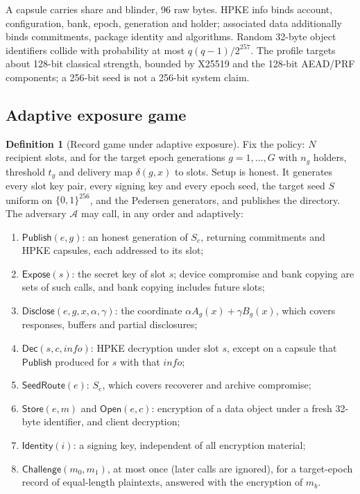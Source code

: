 \documentclass[pdflatex,sn-mathphys-num]{sn-jnl}
\theoremstyle{plain}
\theoremstyle{definition}
\newtheorem{definition}[theorem]{Definition}
\begin{document}
A capsule carries share and blinder, 96 raw bytes. HPKE info binds account, configuration, bank, epoch, generation and holder; associated data additionally binds commitments, package identity and algorithms. Random 32-byte object identifiers collide with probability at most $q(q-1)/2^{257}$. The profile targets about 128-bit classical strength, bounded by X25519 and the 128-bit AEAD/PRF components; a 256-bit seed is not a 256-bit system claim.

\subsection{Adaptive exposure game}\label{sec:adaptive}
\begin{definition}[Record game under adaptive exposure]\label{def:adaptivegame}
Fix the policy: $N$ recipient slots, and for the target epoch generations $g=1,\dots,G$ with $n_g$ holders, threshold $t_g$ and delivery map $\delta(g,x)$ to slots. Setup is honest. It generates every slot key pair, every signing key and every epoch seed, the target seed $S$ uniform on $\{0,1\}^{256}$, and the Pedersen generators, and publishes the directory. The adversary $\mathcal A$ may call, in any order and adaptively:
\begin{enumerate}
\item $\mathsf{Publish}(e,g)$: an honest generation of $S_e$, returning commitments and HPKE capsules, each addressed to its slot;
\item $\mathsf{Expose}(s)$: the secret key of slot $s$; device compromise and bank copying are sets of such calls, and bank copying includes future slots;
\item $\mathsf{Disclose}(e,g,x,\alpha,\gamma)$: the coordinate $\alpha A_g(x)+\gamma B_g(x)$, which covers responses, buffers and partial disclosures;
\item $\mathsf{Dec}(s,c,\mathit{info})$: HPKE decryption under slot $s$, except on a capsule that $\mathsf{Publish}$ produced for $s$ with that $\mathit{info}$;
\item $\mathsf{SeedRoute}(e)$: $S_e$, which covers recoverer and archive compromise;
\item $\mathsf{Store}(e,m)$ and $\mathsf{Open}(e,c)$: encryption of a data object under a fresh 32-byte identifier, and client decryption;
\item $\mathsf{Identity}(i)$: a signing key, independent of all encryption material;
\item $\mathsf{Challenge}(m_0,m_1)$, at most once (later calls are ignored), for a target-epoch record of equal-length plaintexts, answered with the encryption of $m_b$.

\end{enumerate}
\end{definition}
\end{document}
